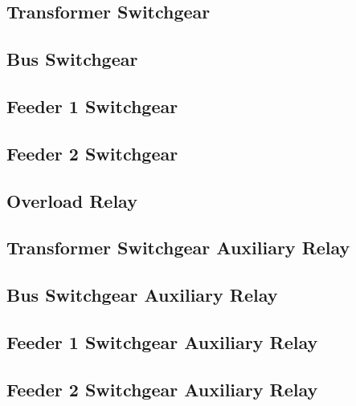 \subsection{Transformer Switchgear}

\newpage

\subsection{Bus Switchgear}

\newpage

\subsection{Feeder 1 Switchgear}

\newpage

\subsection{Feeder 2 Switchgear}

\newpage

\subsection{Overload Relay}

\newpage

\subsection{Transformer Switchgear Auxiliary Relay}

\newpage

\subsection{Bus Switchgear Auxiliary Relay}

\newpage

\subsection{Feeder 1 Switchgear Auxiliary Relay}

\newpage

\subsection{Feeder 2 Switchgear Auxiliary Relay}

\newpage

